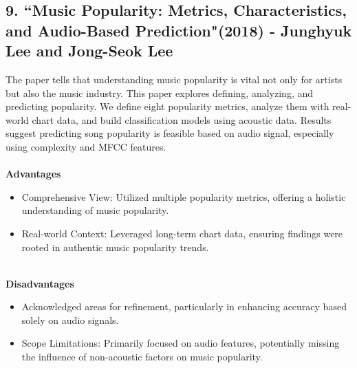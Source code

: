 \documentclass[11pt]{report}
\begin{document}
\subsection*{9.  ``Music Popularity: Metrics, Characteristics, and Audio-Based Prediction"(2018) - Junghyuk Lee and Jong-Seok Lee \cite{reference9}}
The paper tells that understanding music popularity is vital not only for artists but also the music industry. This paper explores defining, analyzing, and predicting popularity. We define eight popularity metrics, analyze them with real-world chart data, and build classification models using acoustic data. Results suggest predicting song popularity is feasible based on audio signal, especially using complexity and MFCC features.
\\ \\
\textbf{Advantages}
\begin{itemize}
        \item Comprehensive View: Utilized multiple popularity metrics, offering a holistic understanding of music popularity.
        \item Real-world Context: Leveraged long-term chart data, ensuring findings were rooted in authentic music popularity trends.
    \end{itemize}
\\    
    \textbf{Disadvantages}
    \begin{itemize}
        \item Acknowledged areas for refinement, particularly in enhancing accuracy based solely on audio signals.
        \item Scope Limitations: Primarily focused on audio features, potentially missing the influence of non-acoustic factors on music popularity.
    \end{itemize}\\\\
\end{document}
